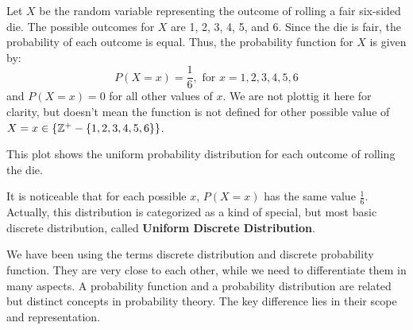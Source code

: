 \begin{example}
    Let \( X \) be the random variable representing the outcome of rolling a fair six-sided die. The possible outcomes for \( X \) are 1, 2, 3, 4, 5, and 6. Since the die is fair, the probability of each outcome is equal. Thus, the probability function for \( X \) is given by:
    \[
    P(X = x) = \frac{1}{6}, \text{ for } x = 1, 2, 3, 4, 5, 6
    \]
    and \( P(X = x) = 0 \) for all other values of \( x \). We are not plottig it here for clarity, but doesn't mean the function is not defined for other possible value of $X = x\in \{\mathbb{Z}^+ - \{1, 2, 3, 4, 5, 6\}\}$.

\begin{center}
\end{center}

    This plot shows the uniform probability distribution for each outcome of rolling the die.
\end{example}

It is noticeable that for each possible $x$, $P(X=x)$ has the same value $\frac{1}{6}$. 
Actually, this distribution is categorized as a kind of special, but most basic discrete distribution, called \textbf{Uniform Discrete Distribution}.

We have been using the terms discrete distribution and discrete probability function. They are very close to each other, while we need to differentiate them in many aspects.
A probability function and a probability distribution are related but distinct concepts in probability theory. The key difference lies in their scope and representation.

